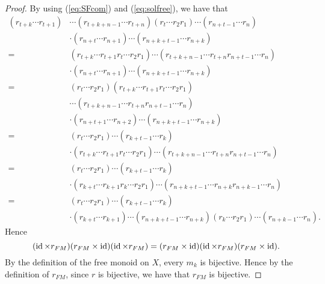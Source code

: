 \begin{proof}
By using (\ref{eq:SFcom}) and (\ref{eq:solfree}), we have that
\begin{align*}
    (r_{t+k}\cdots r_{t+1})&\cdots (r_{t+k+n-1}\cdots r_{t+n})(r_{t}\cdots r_2r_{1})\cdots (r_{n+t-1}\cdots r_{n})\\
    &\cdot (r_{n+t}\cdots r_{n+1})\cdots (r_{n+k+t-1}\cdots r_{n+k})\\
    =&(r_{t+k}\cdots r_{t+1}r_t\cdots r_2r_1)\cdots (r_{t+k+n-1}\cdots r_{t+n}r_{n+t-1}\cdots r_{n})\\
    &\cdot (r_{n+t}\cdots r_{n+1})\cdots (r_{n+k+t-1}\cdots r_{n+k})\\
     =&(r_t\cdots r_2r_1)(r_{t+k}\cdots r_{t+1}r_t\cdots r_2r_1)\\
     &\cdots (r_{t+k+n-1}\cdots r_{t+n}r_{n+t-1}\cdots r_{n})\\
    &\cdot (r_{n+t+1}\cdots r_{n+2})\cdots (r_{n+k+t-1}\cdots r_{n+k})\\
    =&(r_t\cdots r_2r_1)\cdots (r_{k+t-1}\cdots r_{k})\\
    &\cdot (r_{t+k}\cdots r_{t+1}r_t\cdots r_2r_1)\cdots (r_{t+k+n-1}\cdots r_{t+n}r_{n+t-1}\cdots r_{n})\\
    =&(r_t\cdots r_2r_1)\cdots (r_{k+t-1}\cdots r_{k})\\
    &\cdot (r_{k+t}\cdots r_{k+1}r_k\cdots r_2r_1)\cdots (r_{n+k+t-1}\cdots r_{n+k}r_{n+k-1}\cdots r_{n})\\
    =&(r_t\cdots r_2r_1)\cdots (r_{k+t-1}\cdots r_{k})\\
    &\cdot (r_{k+t}\cdots r_{k+1})\cdots (r_{n+k+t-1}\cdots r_{n+k})(r_k\cdots r_2r_1)\cdots (r_{n+k-1}\cdots r_{n}).
\end{align*}
Hence
\[(\operatorname{id}\times r_{FM})(r_{FM}\times \operatorname{id})(\operatorname{id}\times r_{FM})=(r_{FM}\times \operatorname{id})(\operatorname{id}\times r_{FM})(r_{FM}\times \operatorname{id}).\]
By the definition of the free monoid on $X$, every $m_k$ is bijective. Hence by the definition of $r_{FM}$, since $r$ is bijective, we have that $r_{FM}$ is bijective.


\end{proof}
